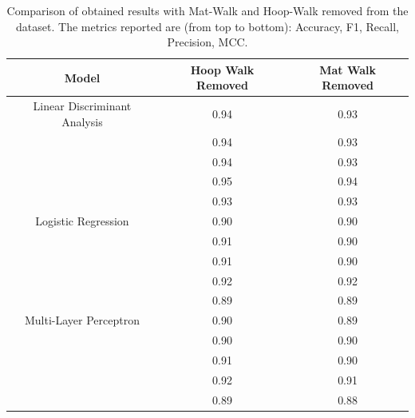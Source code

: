            \begin{table}[htbp]
                \centering
                \caption{Comparison of obtained results with Mat-Walk and Hoop-Walk removed from the dataset. The metrics reported are (from top to bottom): Accuracy, F1, Recall, Precision, MCC.}
                \label{tab:feature_engineering_approach_mat_hoop}
                \begin{tabular}{|c|c|c|}
                \hline
                \textbf{Model} & \textbf{Hoop Walk Removed} & \textbf{Mat Walk Removed} \\ \hline
                    Linear Discriminant Analysis    & 0.94 & 0.93 \\ 
                                                    & 0.94 & 0.93 \\ 
                                                    & 0.94 & 0.93 \\ 
                                                    & 0.95 & 0.94 \\
                                                    & 0.93 & 0.93 \\ 
                                                    \hline
                    Logistic Regression             & 0.90 & 0.90 \\ 
                                                    & 0.91 & 0.90 \\ 
                                                    & 0.91 & 0.90 \\ 
                                                    & 0.92 & 0.92 \\
                                                    & 0.89 & 0.89 \\
                                                    \hline
                    Multi-Layer Perceptron          & 0.90 & 0.89 \\ 
                                                    & 0.90 & 0.90 \\ 
                                                    & 0.91 & 0.90 \\
                                                    & 0.92 & 0.91 \\ 
                                                    & 0.89 & 0.88 \\
                                                    \hline
                \end{tabular}
            \end{table}

